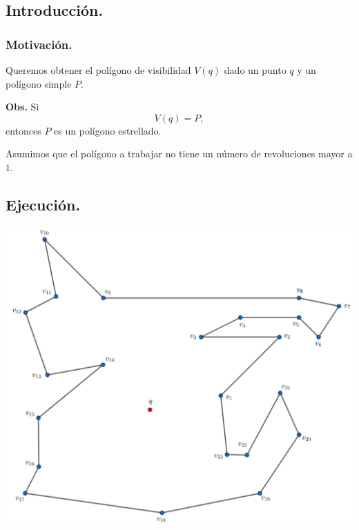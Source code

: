 \subsection{Introducción.}
\begin{frame}
  \frametitle{Motivación.}
  Queremos obtener el polígono de visibilidad $V(q)$ dado un punto $q$ y un polígono
  simple $P$.\newline

  \textbf{Obs.} Si
  \[V(q) = P,\]
  entonces $P$ es un polígono estrellado.\newline

  Asumimos que el polígono a trabajar no tiene un número de revoluciones mayor a $1$.
\end{frame}

\subsection{Ejecución.}
\begin{frame}
  \centering \includegraphics[width=0.70 \paperwidth]{images/Ejecucion/e01.png}
\end{frame}


